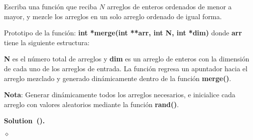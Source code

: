 \documentclass{article}
\theoremstyle{problemstyle}
\newenvironment{solution}[2]{%
  \begin{mdframed}[linewidth=0.8pt,linecolor=Gray,backgroundcolor=Gray!5,roundcorner=5pt, nobreak=#2]%
    \noindent\textbf{Solution\if\relax\detokenize{#1}\relax\else~(#1)\fi.}%
}{%
\hfill $ \diamond $ 
  \end{mdframed}%
}
\begin{document}
\begin{problem}
Escriba una funci\'on que reciba $ N $ arreglos de enteros ordenados de menor a mayor, y mezcle los arreglos en un solo arreglo ordenado de igual forma.

Prototipo de la funci\'on:
\textbf{int *merge(int **arr, int N, int *dim)}
donde \textbf{arr} tiene la siguiente estructura:

\textbf{N} es el n\'umero total de arreglos y \textbf{dim} es un arreglo de enteros con la dimensi\'on de cada uno de los arreglos de entrada. La funci\'on regresa un apuntador hacia el arreglo mezclado y generado din\'amicamente dentro de la funci\'on \textbf{merge()}.


\textbf{Nota}: Generar din\'amicamente todos los arreglos necesarios, e inicialice cada arreglo con valores aleatorios mediante la funci\'on \textbf{rand()}.
\end{problem}
\begin{solution}{}{false}
	
\end{solution}



\end{document}
